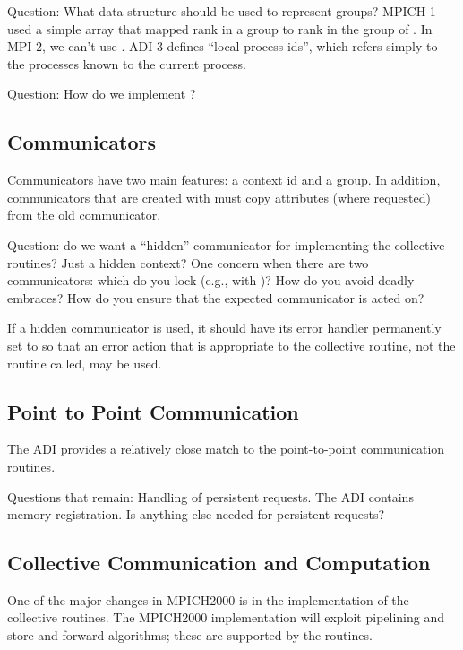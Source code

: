 \documentclass{article}
\begin{document}
Question: What data structure should be used to represent groups?
MPICH-1 used a simple array that mapped rank in a group to rank in the
group of .  In MPI-2, we can't use
.  ADI-3 defines ``local process ids'', which
refers simply to the processes known to the current process.

Question: How do we implement ?

\subsection{Communicators}

Communicators have two main features: a context id and a group.  In
addition, communicators that are created with  must
copy attributes (where requested) from the old communicator.

Question: do we want a ``hidden'' communicator for implementing the
collective routines?  Just a hidden context?  One concern when there
are two communicators: which do you lock (e.g., with
)?  How do you avoid deadly embraces?  How do you
ensure that the expected communicator is acted on?

If a hidden communicator is used, it should have its error handler permanently
set to  so that an error action that is appropriate to
the collective routine, not the routine called, may be used.

\subsection{Point to Point Communication}

The ADI provides a relatively close match to the point-to-point
communication routines.  

Questions that remain:  Handling of persistent requests.  The ADI
contains memory registration.  Is anything else needed for persistent
requests? 

\subsection{Collective Communication and Computation}
One of the major changes in MPICH2000 is in the implementation of the
collective routines.  The MPICH2000 implementation will exploit
pipelining and store and forward algorithms; these are supported by
the  routines.  
\end{document}
